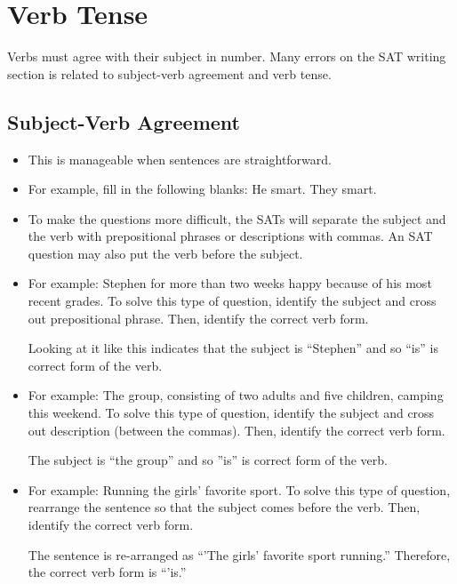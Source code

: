 \section{Verb Tense}

Verbs must agree with their subject in number. Many errors on the SAT writing section is related to subject-verb agreement and verb tense.
\subsection{Subject-Verb Agreement}

\begin{itemize}
\item{This is manageable when sentences are straightforward.}
\item{For example, fill in the following blanks: He \hrulefill smart. They \hrulefill smart.}
\item{To make the questions more difficult, the SATs will separate the subject and the verb with prepositional phrases or descriptions
with commas. An SAT question may also put
the verb before the subject.}
\item{For example: Stephen for more than two weeks \hrulefill happy because of his most recent grades. To solve
this type of question, identify the subject and cross out prepositional phrase. Then, identify
the correct verb form.}

\bigskip
Looking at it like this indicates that the subject is ``Stephen'' and so ``is'' is correct form of
the verb.

\item{For example: The group, consisting of two adults and five children, \hrulefill camping this weekend. To solve this type of question, identify the subject and cross out description (between the commas). Then, identify the correct verb form.}

\bigskip
The subject is ``the group'' and so ''is'' is correct form of the verb.

\item{For example: Running \hrulefill the girls' favorite sport. To solve this type of question, rearrange the sentence so that the subject comes before the verb. Then, identify the correct verb form.}

\bigskip
The sentence is re-arranged as ``'The girls' favorite sport \underline{\hspace{2in}} running.'' Therefore, the correct verb form is ``'is.''
\end{itemize}

